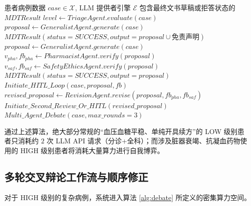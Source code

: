 \documentclass[11pt,a4paper]{ctexart}
\begin{document}
\begin{algorithm}[H]
\caption{Micro-MDT 三级算力自适应动态路由算法}
\label{alg:triage}
\small
\begin{algorithmic}[1]
\Require 患者病例数据 $case \in \mathcal{X}$, LLM 提供者引擎 $\mathcal{E}$
\Ensure 包含最终文书草稿或拒答状态的 $MDTResult$
\State $level \leftarrow TriageAgent.evaluate(case)$ 
    \State $proposal \leftarrow GeneralistAgent.generate(case)$ 
    \State \Return $MDTResult(status=SUCCESS, output=proposal \cup 免责声明)$
    \State $proposal \leftarrow GeneralistAgent.generate(case)$
    \State $v_{pha}, fb_{pha} \leftarrow PharmacistAgent.verify(proposal)$ 
    \State $v_{saf}, fb_{saf} \leftarrow SafetyEthicsAgent.verify(proposal)$
        \State \Return $MDTResult(status=SUCCESS, output=proposal)$ 
        \State \Return $Initiate\_HITL\_Loop(case, proposal, fb)$ 
    \Else
        \State $revised\_proposal \leftarrow RevisionAgent.revise(proposal, fb_{pha}, fb_{saf})$ 
        \State \Return $Initiate\_Second\_Review\_Or\_HITL(revised\_proposal)$
    \EndIf
\Else {}
    \State \Return $Multi\_Agent\_Debate(case, max\_rounds=3)$ 
\EndIf
\end{algorithmic}
\end{algorithm}

通过上述算法，绝大部分常规的“血压血糖平稳、单纯开具续方”的 LOW 级别患者只消耗约 $2$ 次 LLM API 请求（分诊+全科）；而涉及脏器衰竭、抗凝血药物使用的 HIGH 级别患者将消耗大量算力进行自我博弈。

\subsection{多轮交叉辩论工作流与顺序修正}

对于 HIGH 级别的复杂病例，系统进入算法 \ref{alg:debate} 所定义的密集算力空间。
\end{document}
